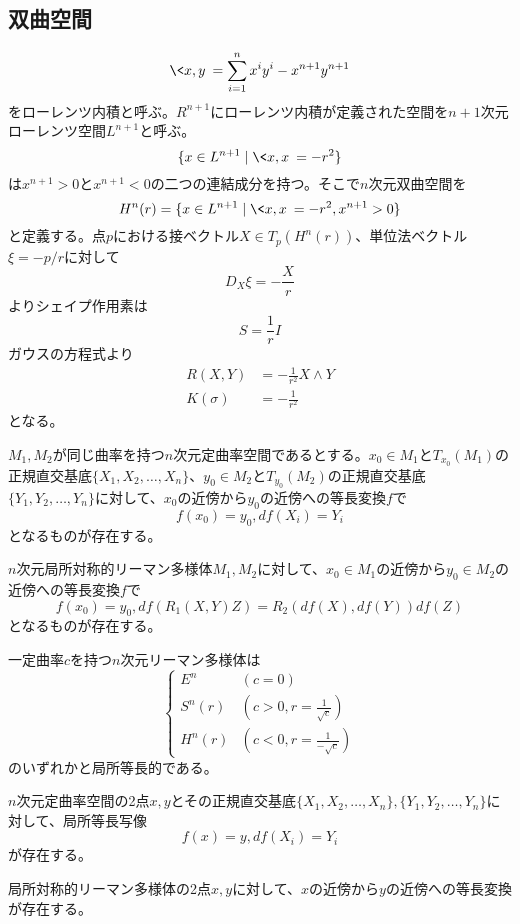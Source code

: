 \subsection{双曲空間}
        \[\<x, y\> = \sum_{i=1}^n x^iy^i - x^{n+1}y^{n+1}\]
    をローレンツ内積と呼ぶ。$R^{n+1}$にローレンツ内積が定義された空間を$n+1$次元ローレンツ空間$L^{n+1}$と呼ぶ。
        \[\{x \in L^{n+1} \mid \<x, x\> = -r^2\}\]
    は$x^{n+1} > 0$と$x^{n+1} < 0$の二つの連結成分を持つ。そこで$n$次元双曲空間を
        \[H^n(r) = \{x \in L^{n+1} \mid \<x, x\> = -r^2, x^{n+1} > 0\}\]
    と定義する。点$p$における接ベクトル$X \in T_p(H^n(r))$、単位法ベクトル$\xi = -p/r$に対して
        \[D_X\xi = -\frac{X}{r}\]
    よりシェイプ作用素は
        \[S = \frac{1}{r}I\]
    ガウスの方程式より
    \begin{align*}
        R(X, Y) &= -\frac{1}{r^2}X \wedge Y\\
        K(\sigma) &= -\frac{1}{r^2}
    \end{align*}
    となる。

\begin{thm}
    $M_1, M_2$が同じ曲率を持つ$n$次元定曲率空間であるとする。$x_0 \in M_1$と$T_{x_0}(M_1)$の正規直交基底$\{X_1, X_2, \dots, X_n\}$、$y_0 \in M_2$と$T_{y_0}(M_2)$の正規直交基底$\{Y_1, Y_2, \dots, Y_n\}$に対して、$x_0$の近傍から$y_0$の近傍への等長変換$f$で
        \[f(x_0) = y_0, df(X_i) = Y_i\]
    となるものが存在する。
\end{thm}
\begin{thm}
    $n$次元局所対称的リーマン多様体$M_1, M_2$に対して、$x_0 \in M_1$の近傍から$y_0 \in M_2$の近傍への等長変換$f$で
        \[f(x_0) = y_0, df(R_1(X, Y)Z) = R_2(df(X), df(Y))df(Z)\]
    となるものが存在する。
\end{thm}
\begin{cor}
    一定曲率$c$を持つ$n$次元リーマン多様体は
    \[\begin{cases}
        E^n & (c = 0)\\
        S^n(r) & (c > 0, r = \frac{1}{\sqrt{c}})\\
        H^n(r) & (c < 0, r = \frac{1}{-\sqrt{c}})
    \end{cases}\]
    のいずれかと局所等長的である。
\end{cor}
\begin{cor}
    $n$次元定曲率空間の2点$x, y$とその正規直交基底$\{X_1, X_2, \dots, X_n\}, \{Y_1, Y_2, \dots, Y_n\}$に対して、局所等長写像
        \[f(x) = y, df(X_i) = Y_i\]
    が存在する。
\end{cor}
\begin{cor}
    局所対称的リーマン多様体の2点$x, y$に対して、$x$の近傍から$y$の近傍への等長変換が存在する。
\end{cor}